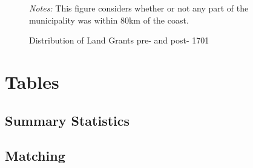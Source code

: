 \documentclass{article}
\begin{document}
\begin{figure}
  \caption{Distribution of Land Grants pre- and post- 1701}
  \begin{center}
  \textit{Notes:} This figure considers whether or not any part of the municipality was within 80km of the coast.
  \end{center}
  \label{fig:SesmariasDistribution}
\end{figure}

\clearpage

\section*{Tables}

\subsection{Summary Statistics}





\clearpage

\subsection{Matching}



\clearpage



\clearpage



\clearpage

\appendix

\setcounter{figure}{0}  
\setcounter{table}{0}  

\renewcommand{\thefigure}{A.\arabic{figure}}
\renewcommand{\thetable}{A.\arabic{table}}
\end{document}
